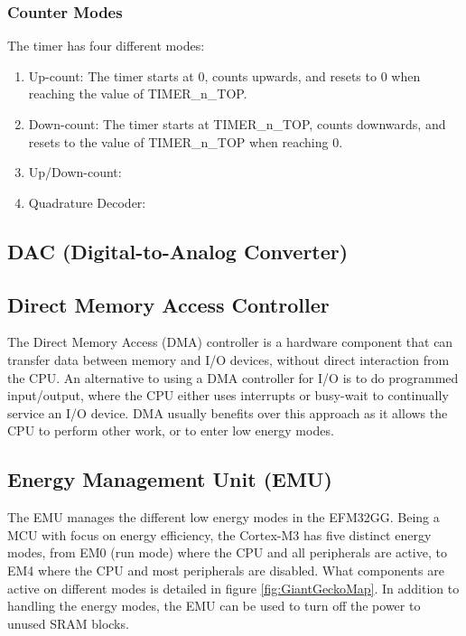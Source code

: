 \subsubsection{Counter Modes}
The timer has four different modes:
\begin{enumerate}
	\item Up-count: The timer starts at 0, counts upwards, and resets to 0 when reaching the value of TIMER\_n\_TOP.
	\item Down-count: The timer starts at TIMER\_n\_TOP, counts downwards, and resets to the value of TIMER\_n\_TOP when reaching 0.

	\item Up/Down-count: %
	\item Quadrature Decoder:
\end{enumerate}


\subsection{DAC (Digital-to-Analog Converter)}


\subsection{Direct Memory Access Controller}
The Direct Memory Access (DMA) controller is a hardware component that can transfer data between memory and I/O devices, without direct interaction from the CPU. An alternative to using a DMA controller for I/O is to do programmed input/output, where the CPU either uses interrupts or busy-wait to continually service an I/O device. DMA usually benefits over this approach as it allows the CPU to perform other work, or to enter low energy modes.


\subsection{Energy Management Unit (EMU)}
The EMU manages the different low energy modes in the EFM32GG. Being a MCU with focus on energy efficiency, the Cortex-M3 has five distinct energy modes, from EM0 (run mode) where the CPU and all peripherals are active, to EM4 where the CPU and most peripherals are disabled. What components are active on different modes is detailed in figure \ref{fig:GiantGeckoMap}. In addition to handling the energy modes, the EMU can be used to turn off the power to unused SRAM blocks.\cite{efm32gg-rm}
